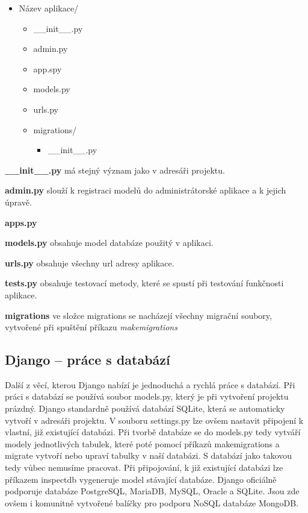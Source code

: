 \begin{itemize}
	\item \lbrack Název aplikace\rbrack /
 	\begin{itemize}
 		\item \_\_init\_\_.py
		\item admin.py
		\item app.spy
		\item models.py
		\item urls.py
		\item \lbrack migrations\rbrack /
		\begin{itemize}
			\item \_\_init\_\_.py
		\end{itemize}
	\end{itemize}
\end{itemize}

\vspace{9px}

\textbf{\_\_init\_\_.py} má stejný význam jako v adresáři projektu. 
\vspace{6px}

\textbf{admin.py} slouží k registraci modelů do administrátorské
aplikace a k jejich úpravě.  \vspace{6px}

\textbf{apps.py} 
\vspace{6px}

\textbf{models.py} obsahuje model databáze použitý v aplikaci.
\vspace{6px}

\textbf{urls.py} obsahuje všechny url adresy aplikace.
\vspace{6px}

\textbf{tests.py} obsahuje testovací metody, které se spustí při
testování funkčnosti aplikace.  \vspace{6px}

\textbf{migrations} ve složce migrations se nacházejí všechny migrační
soubory, vytvořené při spuštění příkazu \textit{makemigrations}

\newpage

\subsection{Django – práce s databází}


Další z věcí, kterou Django nabízí je jednoduchá a rychlá
práce s databází. Při práci s databází se používá soubor models.py,
který je při vytvoření projektu prázdný. Django standardně používá
databází SQLite, která se automaticky vytvoří v adresáři projektu. V
souboru settings.py lze ovšem nastavit připojení k vlastní, již
existující databázi. Při tvorbě databáze se do models.py tedy vytváří
modely jednotlivých tabulek, které poté pomocí příkazů makemigrations
a migrate vytvoří nebo upraví tabulky v naší databázi. S databází jako
takovou tedy vůbec nemusíme pracovat. Při připojování, k již
existující databázi lze příkazem inspectdb vygeneruje model stávající
databáze. Django oficiálně podporuje databáze PostgreSQL, MariaDB,
MySQL, Oracle a SQLite. Jsou zde ovšem i komunitně vytvořené balíčky
pro podporu NoSQL databáze MongoDB.

